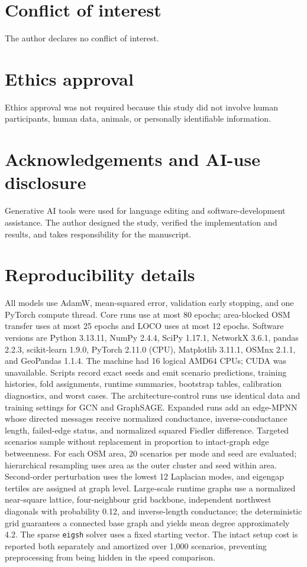 \documentclass[11pt]{article}
\begin{document}
\section*{Conflict of interest}
The author declares no conflict of interest.

\section*{Ethics approval}
Ethics approval was not required because this study did not involve human
participants, human data, animals, or personally identifiable information.

\section*{Acknowledgements and AI-use disclosure}
Generative AI tools were used for language editing and software-development
assistance. The author designed the study, verified the implementation and
results, and takes responsibility for the manuscript.

\appendix
\section{Reproducibility details}
All models use AdamW, mean-squared error, validation early stopping, and one
PyTorch compute thread. Core runs use at most 80 epochs; area-blocked OSM
transfer uses at most 25 epochs and LOCO uses at most 12 epochs. Software versions are Python 3.13.11, NumPy 2.4.4, SciPy
1.17.1, NetworkX 3.6.1, pandas 2.2.3, scikit-learn 1.9.0, PyTorch 2.11.0
(CPU), Matplotlib 3.11.1, OSMnx 2.1.1, and GeoPandas 1.1.4. The machine had 16
logical AMD64 CPUs; CUDA was unavailable. Scripts record exact seeds and emit
scenario predictions, training histories, fold assignments, runtime summaries,
bootstrap tables, calibration diagnostics, and worst cases.
The architecture-control runs use identical data and training settings for GCN
and GraphSAGE. Expanded runs add an edge-MPNN whose directed messages receive
normalized conductance, inverse-conductance length, failed-edge status, and
normalized squared Fiedler difference. Targeted scenarios sample without
replacement in proportion to intact-graph edge betweenness. For each OSM area,
20 scenarios per mode and seed are evaluated; hierarchical resampling uses area
as the outer cluster and seed within area. Second-order perturbation uses the
lowest 12 Laplacian modes, and eigengap tertiles are assigned at graph level.
Large-scale runtime graphs use a normalized near-square lattice,
four-neighbour grid backbone, independent northwest diagonals with probability
0.12, and inverse-length conductance; the deterministic grid guarantees a
connected base graph and yields mean degree approximately 4.2. The sparse
\texttt{eigsh} solver uses a fixed starting vector. The intact setup cost is
reported both separately and amortized over 1,000 scenarios, preventing
preprocessing from being hidden in the speed comparison.
\end{document}
